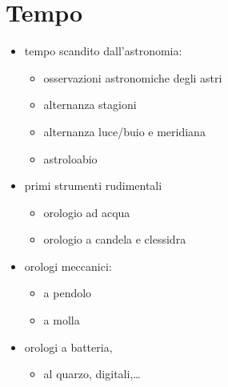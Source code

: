 \documentclass[letterpaper,10pt,italian]{jupyterBook}
\begin{document}
\section{Tempo}
\label{\detokenize{ch/intro/physical_quantities-time:tempo}}\label{\detokenize{ch/intro/physical_quantities-time:physics-hs-intro-physical-quantities-time}}\label{\detokenize{ch/intro/physical_quantities-time::doc}}
\sphinxAtStartPar
{}
\begin{itemize}
\item {} 
\sphinxAtStartPar
tempo scandito dall’astronomia:
\begin{itemize}
\item {} 
\sphinxAtStartPar
osservazioni astronomiche degli astri

\item {} 
\sphinxAtStartPar
alternanza stagioni

\item {} 
\sphinxAtStartPar
alternanza luce/buio e meridiana

\item {} 
\sphinxAtStartPar
astroloabio

\end{itemize}

\item {} 
\sphinxAtStartPar
primi strumenti rudimentali
\begin{itemize}
\item {} 
\sphinxAtStartPar
orologio ad acqua

\item {} 
\sphinxAtStartPar
orologio a candela e clessidra

\end{itemize}

\item {} 
\sphinxAtStartPar
orologi meccanici:
\begin{itemize}
\item {} 
\sphinxAtStartPar
a pendolo

\item {} 
\sphinxAtStartPar
a molla

\end{itemize}

\item {} 
\sphinxAtStartPar
orologi a batteria,
\begin{itemize}
\item {} 
\sphinxAtStartPar
al quarzo, digitali,…

\end{itemize}

\end{itemize}
\end{document}
